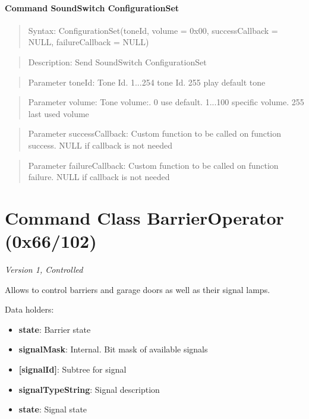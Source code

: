 \paragraph{Command SoundSwitch ConfigurationSet}
\begin{quote}Syntax: ConfigurationSet(toneId, volume = 0x00, successCallback = NULL, failureCallback = NULL)\end{quote}
\begin{quote}Description: Send SoundSwitch ConfigurationSet\end{quote}
\begin{quote}Parameter toneId: Tone Id. 1...254 tone Id. 255 play default tone\end{quote}
\begin{quote}Parameter volume: Tone volume:. 0 use default. 1...100 specific volume. 255 last used volume\end{quote}
\begin{quote}Parameter successCallback: Custom function to be called on function success. NULL if callback is not needed\end{quote}
\begin{quote}Parameter failureCallback: Custom function to be called on function failure. NULL if callback is not needed\end{quote}



\section{Command Class BarrierOperator (0x66/102)}

\textit{Version 1, Controlled}
\newline

Allows to control barriers and garage doors as well as their signal lamps.
\newline

\noindent
Data holders:

\begin{itemize}
\item \textbf{state}: Barrier state
\item \textbf{signalMask}: Internal. Bit mask of available signals
\item \textbf{[signalId]}: Subtree for signal
\item \qquad\textbf{signalTypeString}: Signal description
\item \qquad\textbf{state}: Signal state
\end{itemize}

